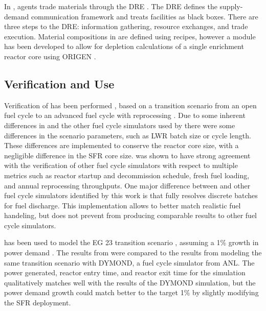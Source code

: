 In \Cyclus, agents trade materials through the \gls{DRE} 
\cite{gidden_agent-based_2015,huff_fundamental_2016}. The \gls{DRE} defines the 
supply-demand communication framework and treats facilities as black boxes. 
There are three steps to the \gls{DRE}: information gathering, resource 
exchanges, and trade execution. Material compositions in \Cyclus are 
defined using recipes, however a module has been developed to allow for 
depletion calculations of a single enrichment reactor core using ORIGEN 
\cite{skutnik_cyborg:_2016}.

\subsection{Verification and Use}
Verification of \Cyclus has been performed \cite{bae_standardized_2019}, 
based on a transition scenario from an open fuel cycle to an advanced
fuel cycle with reprocessing \cite{feng_standardized_2016}. Due to 
some inherent differences in \Cyclus and the other fuel cycle simulators 
used by \cite{feng_standardized_2016} there were some differences in 
the scenario parameters, such as \gls{LWR} batch size or 
cycle length. These differences are implemented to conserve the reactor 
core size, with a negligible difference in the \gls{SFR} core size. \Cyclus 
was shown to have strong agreement with the verification of other 
fuel cycle simulators \cite{bae_standardized_2019} with respect to 
multiple metrics such as reactor startup and decommission schedule, fresh 
fuel loading, and annual reprocessing throughputs. One major difference
between \Cyclus and other fuel cycle simulators identified by this work 
is that \Cyclus fully resolves discrete batches for fuel discharge. This 
implementation allows \Cyclus to better match realistic fuel handeling, but 
does not prevent \Cyclus from producing comparable results to other 
fuel cycle simulators. 

\Cyclus has been used to model the EG 23 transition scenario 
\cite{wigeland_nuclear_2014}, assuming a 1\% growth in power demand 
\cite{djokic_application_2015}. The results from \Cyclus were compared 
to the results from modeling the same transition scenario with \gls{DYMOND}, 
a fuel cycle simulator from \gls{ANL}. The power generated, reactor entry 
time, and reactor exit time for the \Cyclus simulation qualitatively 
matches well with the results of the \gls{DYMOND} simulation, but the power 
demand growth could match better to the target 1\% by slightly modifying 
the \gls{SFR} deployment. 

